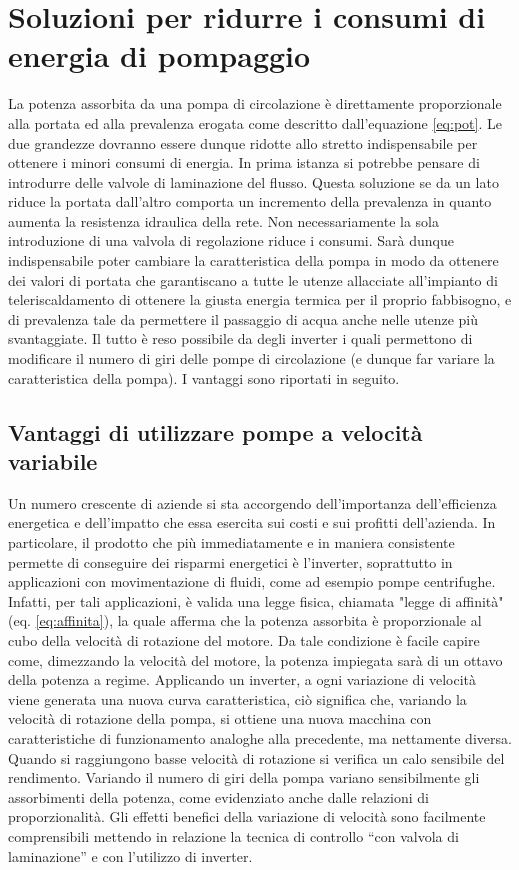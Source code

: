 \documentclass[laurea,oneside,11pt]{USiena_tesiLM}
\begin{document}
\section{Soluzioni per ridurre i consumi di energia di pompaggio}
La potenza assorbita da una pompa di circolazione è direttamente proporzionale alla portata ed alla prevalenza erogata come descritto dall'equazione \ref{eq:pot}. Le due grandezze dovranno essere dunque ridotte allo stretto indispensabile per ottenere i minori consumi di energia.
In prima istanza si potrebbe pensare di introdurre delle valvole di laminazione del flusso. Questa soluzione se da un lato riduce la portata dall'altro comporta un incremento della prevalenza in quanto aumenta la resistenza idraulica della rete.
Non necessariamente la sola introduzione di una valvola di regolazione riduce i consumi. Sarà dunque indispensabile poter cambiare la caratteristica della pompa in modo da ottenere dei valori di portata che garantiscano a tutte le utenze allacciate all'impianto di teleriscaldamento di ottenere la giusta energia termica per il proprio fabbisogno, e di prevalenza tale da permettere il passaggio di acqua anche nelle utenze più svantaggiate.
Il tutto è reso possibile da degli inverter i quali permettono di modificare il numero di giri delle pompe di circolazione (e dunque far variare la caratteristica della pompa). I vantaggi sono riportati in seguito.

\subsection{Vantaggi di utilizzare pompe a velocità variabile}
Un numero crescente di aziende si sta accorgendo dell'importanza dell'efficienza energetica e dell'impatto che essa esercita sui costi e sui profitti dell'azienda.
In particolare, il prodotto che più immediatamente e in maniera consistente permette di conseguire dei risparmi energetici è l'inverter, soprattutto in applicazioni con movimentazione di fluidi, come ad esempio pompe centrifughe. Infatti, per tali applicazioni, è valida una legge fisica, chiamata "legge di affinità" (eq. \ref{eq:affinita}), la quale afferma che la potenza assorbita è proporzionale al cubo della velocità di rotazione del motore. Da tale condizione è facile capire come, dimezzando la velocità del motore, la potenza impiegata sarà di un ottavo della potenza a regime. 
Applicando un inverter, a ogni variazione di velocità viene generata una nuova curva caratteristica, ciò significa che, variando la velocità di rotazione della pompa, si ottiene una nuova macchina con caratteristiche di funzionamento analoghe alla precedente, ma nettamente diversa. Quando si raggiungono basse velocità di rotazione si verifica un calo sensibile del rendimento. Variando il numero di giri della pompa variano sensibilmente gli assorbimenti della potenza, come evidenziato anche dalle relazioni di proporzionalità. Gli effetti benefici della variazione di velocità sono facilmente comprensibili mettendo in relazione la tecnica di controllo “con valvola di laminazione” e con l’utilizzo di inverter. 
\end{document}
